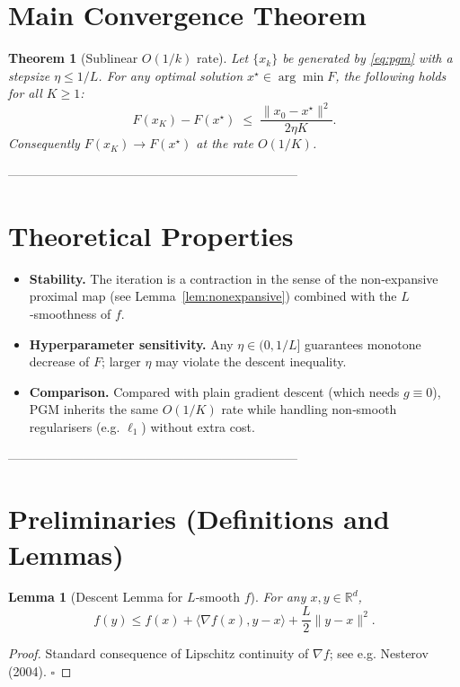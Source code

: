 \documentclass{article}
\newtheorem{theorem}{Theorem}
\newtheorem{lemma}{Lemma}
\newcommand{\R}{\mathbb{R}}
\begin{document}
\section*{Main Convergence Theorem}
\begin{theorem}[Sublinear $O(1/k)$ rate]
\label{thm:rate}
Let $\{x_{k}\}$ be generated by \eqref{eq:pgm} with a stepsize $\eta\le 1/L$.  
For any optimal solution $x^{\star}\in\arg\min F$, the following holds for all $K\ge 1$:
\[
F(x_{K})-F(x^{\star})
\;\le\;
\frac{\|x_{0}-x^{\star}\|^{2}}{2\eta K}.
\]
Consequently $F(x_{K})\to F(x^{\star})$ at the rate $O(1/K)$.
\end{theorem}

---------------------------------------------------------------------

\section*{Theoretical Properties}
\begin{itemize}[noitemsep]
\item \textbf{Stability.} The iteration is a contraction in the sense of the non‑expansive proximal map (see Lemma~\ref{lem:nonexpansive}) combined with the $L$‑smoothness of $f$.
\item \textbf{Hyperparameter sensitivity.} Any $\eta\in(0,1/L]$ guarantees monotone decrease of $F$; larger $\eta$ may violate the descent inequality.
\item \textbf{Comparison.} Compared with plain gradient descent (which needs $g\equiv0$), PGM inherits the same $O(1/K)$ rate while handling non‑smooth regularisers (e.g. $\ell_{1}$) without extra cost.
\end{itemize}

---------------------------------------------------------------------

\section*{Preliminaries (Definitions and Lemmas)}
\begin{lemma}[Descent Lemma for $L$‑smooth $f$]
\label{lem:descent}
For any $x,y\in\R^{d}$,
\[
f(y)\le f(x)+\langle\nabla f(x),y-x\rangle+\frac{L}{2}\|y-x\|^{2}.
\]
\end{lemma}
\begin{proof}
Standard consequence of Lipschitz continuity of $\nabla f$; see e.g. Nesterov (2004). \hfill $\square$
\end{proof}
\end{document}
